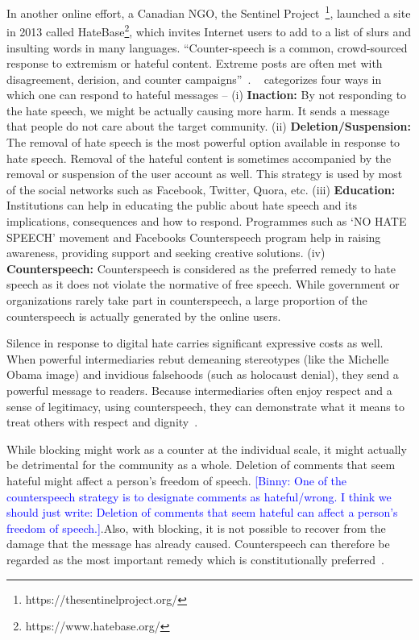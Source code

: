 \documentclass[11pt,a4paper]{article}
\newcommand{\binny}[1]{\textcolor{blue}{[Binny: #1]}}
\begin{document}
{{In another online effort, a Canadian NGO, the Sentinel Project~\footnote{https://thesentinelproject.org/}, launched a site in 2013 called HateBase\footnote{https://www.hatebase.org/}, which invites Internet users to add to a list of slurs and insulting words in many languages.
\fi
``Counter-speech is a common, crowd-sourced response to extremism or hateful content. Extreme
posts are often met with disagreement, derision, and counter campaigns''~\cite{bartlett2015counter}. ~\citet{citron2011intermediaries} categorizes four ways in which one can respond to hateful messages -- (i) \textbf{Inaction:} By not responding to the hate speech, we might be actually causing more harm. It sends a message that people do not care about the target community. (ii) \textbf{Deletion/Suspension:} The removal of hate speech is the most powerful option available in response to hate speech. Removal of the hateful content is sometimes accompanied by the removal or suspension of the user account as well. This strategy is used by most of the social networks such as Facebook, Twitter, Quora, etc. (iii) \textbf{Education:} Institutions can help in educating the public about hate speech and its implications, consequences and how to respond. Programmes such as `NO HATE SPEECH' movement and Facebooks Counterspeech program help in raising awareness, providing support and seeking creative solutions. (iv) \textbf{Counterspeech:} Counterspeech is considered as the preferred remedy to hate speech as it does not violate the normative of free speech. While government or organizations rarely take part in counterspeech, a large proportion of the counterspeech is actually generated by the online users.



Silence in response to digital hate carries significant expressive costs as well. When powerful intermediaries rebut demeaning
stereotypes (like the Michelle Obama image) and invidious falsehoods (such as holocaust denial), they send a powerful message to readers. Because intermediaries often enjoy respect and a sense of legitimacy, using counterspeech, they can demonstrate what it means to treat others with respect and dignity~\cite{citron2011intermediaries}.

While blocking might work as a counter at the individual scale, it might actually be detrimental for the community as a whole. Deletion of comments that seem hateful might affect a person's freedom of speech. \binny{One of the counterspeech strategy is to designate comments as hateful/wrong. I think we should just write: Deletion of comments that seem hateful can affect a person's freedom of speech.}.\fi Also, with blocking, it is not possible to recover from the damage that the message has already caused. Counterspeech can therefore be regarded as the most important remedy which is constitutionally preferred~\cite{benesch2014countering}.

}}
\end{document}
